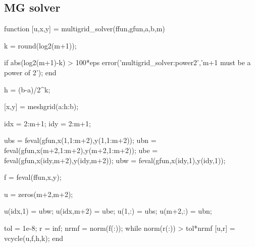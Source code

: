 \documentclass[12pt,a4paper]{article}
\begin{document}
	
	\subsection{MG solver}
	\begingroup\makeatletter{}
	\verbatim
	function [u,x,y] = multigrid_solver(ffun,gfun,a,b,m)
	
	k = round(log2(m+1));
	
	if abs(log2(m+1)-k) > 100*eps
	error('multigrid_solver:power2','m+1 must be a power of 2');
	end
	
	h = (b-a)/2^k;   %
	
	[x,y] = meshgrid(a:h:b);   %
	
	idx = 2:m+1;
	idy = 2:m+1;
	
	ubs = feval(gfun,x(1,1:m+2),y(1,1:m+2));     %
	ubn = feval(gfun,x(m+2,1:m+2),y(m+2,1:m+2)); %
	ube = feval(gfun,x(idy,m+2),y(idy,m+2));     %
	ubw = feval(gfun,x(idy,1),y(idy,1));         %
	
	f = feval(ffun,x,y);
	
	u = zeros(m+2,m+2);
	
	u(idx,1) = ubw; u(idx,m+2) = ube;
	u(1,:) = ubs; u(m+2,:) = ubn;
	
	tol = 1e-8;
	r = inf;
	nrmf = norm(f(:));
	while norm(r(:)) > tol*nrmf
	[u,r] = vcycle(u,f,h,k);
	end
	
\end{document}
